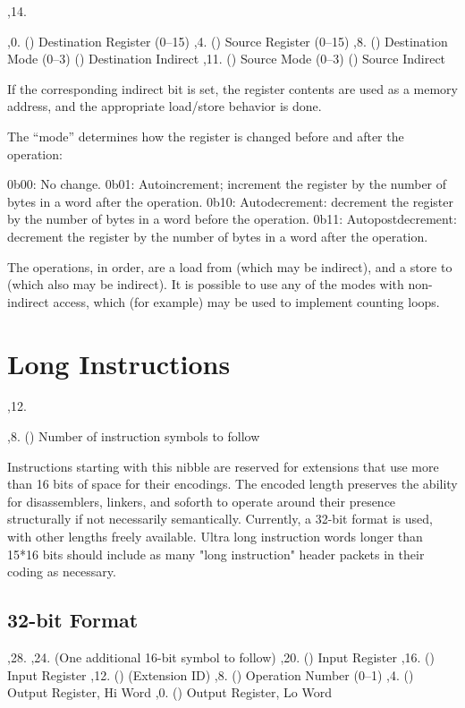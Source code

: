 \noindent\ins{},14. 

\li \ins{},0. () Destination Register (0--15)
\li \ins{},4. () Source Register (0--15)
\li \ins{},8. () Destination Mode (0--3)
\li \ins{} () Destination Indirect
\li \ins{},11. () Source Mode (0--3)
\li \ins{} () Source Indirect

If the corresponding indirect bit is set, the register contents are used as a
memory address, and the appropriate load/store behavior is done.

The ``mode'' determines how the register is changed before and after the
operation:

\li 0b00: No change.
\li 0b01: Autoincrement; increment the register by the number of bytes in a
word after the operation.
\li 0b10: Autodecrement: decrement the register by the number of bytes in a
word before the operation.
\li 0b11: Autopostdecrement: decrement the register by the number of bytes in a
word after the operation.

The operations, in order, are a load from  (which may be indirect), and
a store to  (which also may be indirect). It is possible to use any of
the modes with non-indirect access, which (for example) may be used to
implement counting loops.

\section{Long Instructions}

\noindent\ins{},12. 

\li \ins{},8. () Number of instruction symbols to follow

Instructions starting with this nibble are reserved for extensions that use more than
16 bits of space for their encodings. The encoded length preserves the ability
for disassemblers, linkers, and soforth to operate around their presence structurally
if not necessarily semantically. Currently, a 32-bit format is used, with other
lengths freely available. Ultra long instruction words longer than 15*16 bits should
include as many "long instruction" header packets in their coding as necessary.

\subsection{32-bit Format}

\li \ins{},28. 
\li \ins{},24.  (One additional 16-bit symbol to follow)
\li \ins{},20. () Input Register
\li \ins{},16. () Input Register
\li \ins{},12. ()  (Extension ID)
\li \ins{},8. () Operation Number (0--1)
\li \ins{},4. () Output Register, Hi Word
\li \ins{},0. () Output Register, Lo Word

